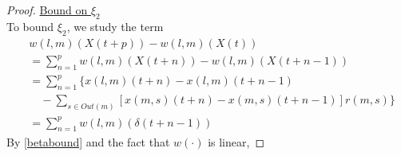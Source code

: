 \begin{proof}
\underline{Bound on $\xi_{2}$} \\
%
%
%
To bound $\xi_2$, we study the term
\begin{align} \nonumber
&w(l,m)(X(t+p))   -  w(l,m)(X(t)) \\ \nonumber
& = \sum_{n=1}^{p} w(l,m)(X(t+n)) - w(l,m)(X(t + n - 1)) \\ \nonumber
&= \sum_{n=1}^{p} \Big\{ x(l,m)(t + n) - x(l,m)(t + n - 1)   \\ \nonumber 
&  \quad - \sum_{s \in Out(m)}[ x(m,s)(t + n) - x(m,s)(t + n - 1) ]r(m,s)  \Big\} \\ 
&= \sum_{n=1}^{p}  w(l,m)( \delta(t + n - 1)) 
\end{align}
By \eqref{betabound} and the fact that $w(\cdot)$ is linear,  

\end{proof}
